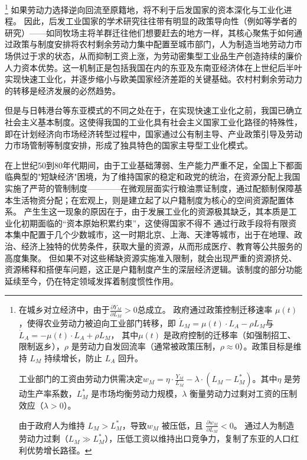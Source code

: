\documentclass[a4paper,12pt,oneside, fontset=mac]{ctexbook} %
\begin{document}
\footnote{
  在城乡对立经济中，由于\(\frac{\partial Y_M}{\partial L_M}>0\)总成立。
  政府通过政策控制迁移速率 \( \mu(t) \)，使得农业劳动力被迫向工业部门转移，即
  \(\dot{L}_M = \mu(t) \cdot L_A - \rho L_M\)与\(\dot{L}_A = -\mu(t) \cdot L_A + \rho L_M\)，
  其中\( \mu(t) \) 是政府控制的迁移率（如强制招工、限制返乡），\( \rho \) 是劳动力自发回流率（通常被政策压制，\( \rho \approx 0 \)）。政策目标是维持 \( L_M \) 持续增长，防止 \( L_A \) 回升。

  工业部门的工资由劳动力供需决定\(w_M = \eta \cdot \frac{Y_M}{L_M}  - \lambda \cdot (L_M - L_M^*)\)。其中\( \eta \) 是劳动生产率系数，\( L_M^* \) 是市场均衡劳动力规模，\( \lambda \) 衡量劳动力过剩对工资的压制效应（\( \lambda > 0 \)）。

  由于政府人为维持 \( L_M > L_M^* \)，导致\(w_M \text{ 被压低，且 } \frac{\partial w_M}{\partial L_M} < 0\)。
  通过人为制造劳动力过剩（\( L_M \gg L_M^* \)），压低工资以维持出口竞争力，复制了东亚的人口红利优势增长路径。
}
如果劳动力选择逆向回流至原籍地，将不利于后发国家的资本深化与工业化进程。
因此，后发工业国家的学术研究往往带有明显的政策导向性（例如\cite{QuanZhuoWeiWoGuoNongCunShengYuLaoDongLiZhuanYiDeYanJiu1996}等学者的研究）——如同牧场主将羊群迁往他们想要赶去的地方一样，其核心聚焦于如何通过政策与制度安排将农村剩余劳动力集中配置至城市部门，人为制造当地劳动力市场供过于求的状态，从而抑制工资上涨，为劳动密集型工业品生产创造持续的廉价人力资本优势。这一机制正是包括我国在内的东亚及东南亚经济体在上世纪后半叶实现快速工业化，并逐步缩小与欧美国家经济差距的关键基础。农村村剩余劳动力的转移是经济发展的必然趋势。

但是与日韩港台等东亚模式的不同之处在于，在实现快速工业化之前，我国已确立社会主义基本制度。这使得我国的工业化具有社会主义国家工业化路径的特殊性，即在计划经济向市场经济转型过程中，国家通过公有制主导、产业政策引导及劳动力市场管制等制度安排，形成了独具特色的国家主导型工业化模式。

在上世纪50到80年代期间，由于工业基础薄弱、生产能力严重不足，全国上下都面临典型的"短缺经济"困境，为了维持国家的稳定和政党的统治，在资源分配上我国实施了严苛的管制制度————在微观层面实行粮油票证制度，通过配额制保障基本生活物资分配；在宏观上，则是建立起了以户籍制度为核心的空间资源配置体系。
产生生这一现象的原因在于，由于发展工业化的资源极其缺乏，其本质是工业化初期面临的“资本原始积累约束”，这使得国家不得不
通过行政手段将有限资本集中配置于几个少数城市，这一时期北京、上海、天津等城市，出于在地理、政治、经济上独特的优势条件，获取大量的资源，从而形成医疗、教育等公共服务的高度集聚。
但如果不对这些稀缺资源实施准入限制，就会出现严重的资源挤兑、资源稀释和搭便车问题，这正是户籍制度产生的深层经济逻辑。该制度的部分功能延续至今，仍在特定领域发挥着制度惯性作用。
\end{document}
